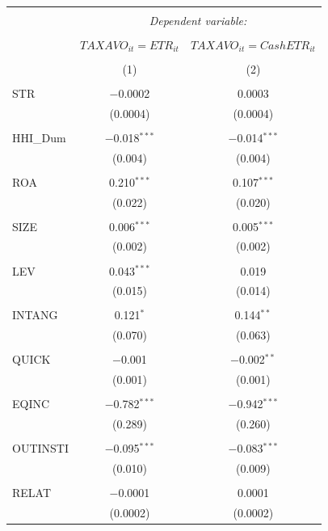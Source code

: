 \documentclass[a4paper,14pt]{article}\usepackage[]{graphicx}\usepackage[]{color}
\begin{document}
\begin{table}[!htbp] \centering 
  \caption{} 
  \label{} 
\begin{tabular}{@{\extracolsep{5pt}}lcc} 
\\[-1.8ex]\hline 
\hline \\[-1.8ex] 
 & \multicolumn{2}{c}{\textit{Dependent variable:}} \\ 
\cline{2-3} 
\\[-1.8ex] & $TAXAVO_{it}=ETR_{it}$ & $TAXAVO_{it}=CashETR_{it}$ \\ 
\\[-1.8ex] & (1) & (2)\\ 
\hline \\[-1.8ex] 
 STR & $-$0.0002 & 0.0003 \\ 
  & (0.0004) & (0.0004) \\ 
  & & \\ 
 HHI\_Dum & $-$0.018$^{***}$ & $-$0.014$^{***}$ \\ 
  & (0.004) & (0.004) \\ 
  & & \\ 
 ROA & 0.210$^{***}$ & 0.107$^{***}$ \\ 
  & (0.022) & (0.020) \\ 
  & & \\ 
 SIZE & 0.006$^{***}$ & 0.005$^{***}$ \\ 
  & (0.002) & (0.002) \\ 
  & & \\ 
 LEV & 0.043$^{***}$ & 0.019 \\ 
  & (0.015) & (0.014) \\ 
  & & \\ 
 INTANG & 0.121$^{*}$ & 0.144$^{**}$ \\ 
  & (0.070) & (0.063) \\ 
  & & \\ 
 QUICK & $-$0.001 & $-$0.002$^{**}$ \\ 
  & (0.001) & (0.001) \\ 
  & & \\ 
 EQINC & $-$0.782$^{***}$ & $-$0.942$^{***}$ \\ 
  & (0.289) & (0.260) \\ 
  & & \\ 
 OUTINSTI & $-$0.095$^{***}$ & $-$0.083$^{***}$ \\ 
  & (0.010) & (0.009) \\ 
  & & \\ 
 RELAT & $-$0.0001 & 0.0001 \\ 
  & (0.0002) & (0.0002) \\ 

\end{tabular}
\end{table}
\end{document}
